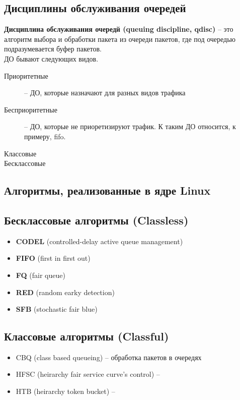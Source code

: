 	\subsection{Дисциплины обслуживания очередей}

		\textbf{Дисциплина обслуживания очередй (queuing discipline, qdisc)} -- это алгоритм выбора и обработки пакета
		из очереди пакетов, где под очередью подразумевается буфер пакетов. \\
		
		ДО бывают следующих видов.
		\begin{description}
			\item[Приоритетные] -- ДО, которые назначают для разных видов трафика 
			\item[Бесприоритетные] -- ДО, которые не приоретизируют трафик. К таким ДО относится, к примеру, fifo.
			\item[Классовые]
			\item[Бесклассовые]
		\end{description}


	\subsection{Алгоритмы, реализованные в ядре Linux}

			\subsection{Бесклассовые алгоритмы (Classless)}
				\begin{itemize}
					\item \textbf{CODEL} (controlled-delay active queue management)
					\item \textbf{FIFO} (first in first out)
					\item \textbf{FQ} (fair queue)
					\item \textbf{RED} (random earky detection)
					\item \textbf{SFB} (stochastic fair blue)
				\end{itemize}

			\subsection{Классовые алгоритмы (Classful)}
				\begin{itemize}
               		\item CBQ (class based queueing) -- обработка пакетов в очередях 
               		\item HFSC (heirarchy fair service curve's control) --
               		\item HTB  (heirarchy token bucket) -- 
				\end{itemize}
			

